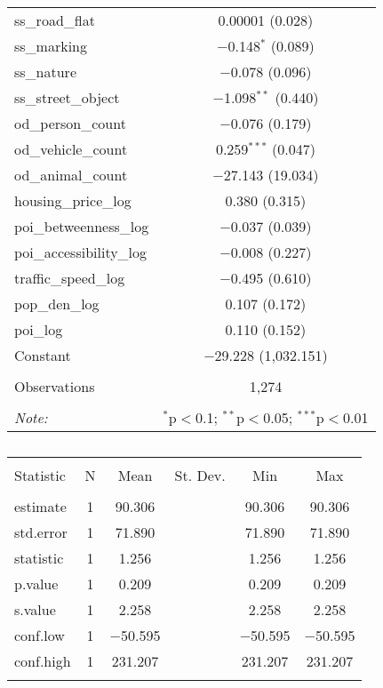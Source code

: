 \begin{table}[!htbp]
\begin{tabular}{@{\extracolsep{1pt}}lc}
  ss\_road\_flat & 0.00001 (0.028) \\ 
  ss\_marking & $-$0.148$^{*}$ (0.089) \\ 
  ss\_nature & $-$0.078 (0.096) \\ 
  ss\_street\_object & $-$1.098$^{**}$ (0.440) \\ 
  od\_person\_count & $-$0.076 (0.179) \\ 
  od\_vehicle\_count & 0.259$^{***}$ (0.047) \\ 
  od\_animal\_count & $-$27.143 (19.034) \\ 
  housing\_price\_log & 0.380 (0.315) \\ 
  poi\_betweenness\_log & $-$0.037 (0.039) \\ 
  poi\_accessibility\_log & $-$0.008 (0.227) \\ 
  traffic\_speed\_log & $-$0.495 (0.610) \\ 
  pop\_den\_log & 0.107 (0.172) \\ 
  poi\_log & 0.110 (0.152) \\ 
  Constant & $-$29.228 (1,032.151) \\ 
 \hline \\[-1.8ex] 
Observations & 1,274 \\ 
\hline 
\hline \\[-1.8ex] 
\textit{Note:}  & \multicolumn{1}{r}{$^{*}$p$<$0.1; $^{**}$p$<$0.05; $^{***}$p$<$0.01} \\ 
\end{tabular} 
\end{table} 

\begin{table}[!htbp] \centering 
  \caption{} 
  \label{} 
\small 
\begin{tabular}{@{\extracolsep{1pt}}lccccc} 
\\[-1.8ex]\hline 
\hline \\[-1.8ex] 
Statistic & \multicolumn{1}{c}{N} & \multicolumn{1}{c}{Mean} & \multicolumn{1}{c}{St. Dev.} & \multicolumn{1}{c}{Min} & \multicolumn{1}{c}{Max} \\ 
\hline \\[-1.8ex] 
estimate & 1 & 90.306 &  & 90.306 & 90.306 \\ 
std.error & 1 & 71.890 &  & 71.890 & 71.890 \\ 
statistic & 1 & 1.256 &  & 1.256 & 1.256 \\ 
p.value & 1 & 0.209 &  & 0.209 & 0.209 \\ 
s.value & 1 & 2.258 &  & 2.258 & 2.258 \\ 
conf.low & 1 & $-$50.595 &  & $-$50.595 & $-$50.595 \\ 
conf.high & 1 & 231.207 &  & 231.207 & 231.207 \\ 
\hline \\[-1.8ex] 
\end{tabular} 
\end{table} 

